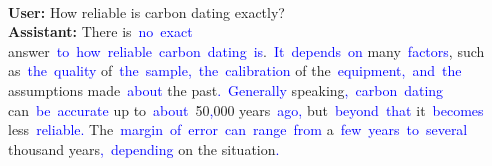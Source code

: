 \begin{tcolorbox}[colframe=gray!70!black,colback=white, title=Sample 5]
\\
\textbf{User:}
How reliable is carbon dating exactly?\vspace{0.1in}
\\
\textbf{Assistant:}
There is\textcolor{blue}{~no}\textcolor{blue}{~exact} answer\textcolor{blue}{~to}\textcolor{blue}{~how}\textcolor{blue}{~reliable}\textcolor{blue}{~carbon}\textcolor{blue}{~dating}\textcolor{blue}{~is}.\textcolor{blue}{~It}\textcolor{blue}{~depends}\textcolor{blue}{~on} many\textcolor{blue}{~factors}, such as\textcolor{blue}{~the}\textcolor{blue}{~quality} of\textcolor{blue}{~the}\textcolor{blue}{~sample}\textcolor{blue}{,}\textcolor{blue}{~the}\textcolor{blue}{~calibration} of the\textcolor{blue}{~equipment}\textcolor{blue}{,}\textcolor{blue}{~and}\textcolor{blue}{~the} assumptions made\textcolor{blue}{~about} the past\textcolor{blue}{.}\textcolor{blue}{~Generally} speaking\textcolor{blue}{,}\textcolor{blue}{~carbon}\textcolor{blue}{~dating} can\textcolor{blue}{~be}\textcolor{blue}{~accurate} up to\textcolor{blue}{~about}\textcolor{blue}{~}50\textcolor{blue}{,}000 years\textcolor{blue}{~ago}\textcolor{blue}{,} but\textcolor{blue}{~beyond}\textcolor{blue}{~that} it\textcolor{blue}{~becomes} less\textcolor{blue}{~reliable}\textcolor{blue}{.} The\textcolor{blue}{~margin}\textcolor{blue}{~of}\textcolor{blue}{~error}\textcolor{blue}{~can}\textcolor{blue}{~range}\textcolor{blue}{~from} a\textcolor{blue}{~few}\textcolor{blue}{~years}\textcolor{blue}{~to}\textcolor{blue}{~several} thousand years\textcolor{blue}{,}\textcolor{blue}{~depending} on the situation\textcolor{blue}{.}\textcolor{blue}{}
\end{tcolorbox}



